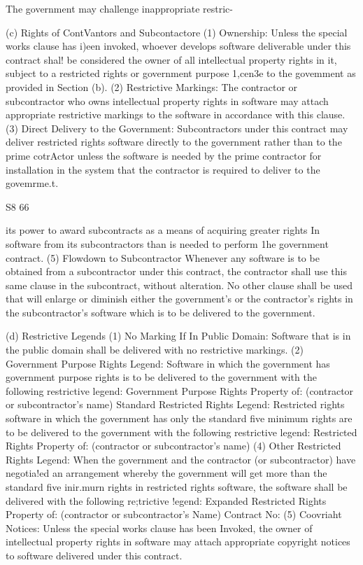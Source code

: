 \documentclass[12pt]{article}
\begin{document}
The government may challenge inappropriate restric-

(c) Rights of ContVantors and Subcontactore
(1) Ownership: Unless the special works clause has i)een invoked, whoever develops software deliverable under this contract shal! be considered the owner of all intellectual property rights in
it, subject to a restricted rights or government purpose 1,cen3e to the govemment as provided in
Section (b).
(2) Restrictive Markings: The contractor or subcontractor who owns intellectual property
rights in software may attach appropriate restrictive markings to the software in accordance with this
clause.
(3) Direct Delivery to the Government: Subcontractors under this contract may deliver
restricted rights software directly to the government rather than to the prime cotrActor unless the
software is needed by the prime contractor for installation in the system that the contractor is required
to deliver to the govemrme.t.

S8
66

its power to award subcontracts as a means of acquiring greater rights In software from its subcontractors than is needed to perform 1he government contract.
(5) Flowdown to Subcontractor Whenever any software is to be obtained from a subcontractor under this contract, the contractor shall use this same clause in the subcontract, without alteration.
No other clause shall be used that will enlarge or diminish either the government's or the contractor's
rights in the subcontractor's software which is to be delivered to the government.

(d) Restrictive Legends
(1) No Marking If In Public Domain: Software that is in the public domain shall be delivered
with no restrictive markings.
(2) Government Purpose Rights Legend: Software in which the government has government purpose rights is to be delivered to the government with the following restrictive legend:
Government Purpose Rights
Property of: (contractor or subcontractor's name)
Standard Restricted Rights Legend: Restricted rights software in which the government has only the
standard five minimum rights are to be delivered to the government with the following restrictive
legend:
Restricted Rights
Property of: (contractor or subcontractor's name)
(4) Other Restricted Rights Legend: When the government and the contractor (or
subcontractor) have negotia!ed an arrangement whereby the government will get more than the standard five inir.murn rights in restricted rights software, the software shall be delivered with the following re;trictive !egend:
Expanded Restricted Rights
Property of: (contractor or subcontractor's Name)
Contract No:
(5) Coovriaht Notices: Unless the special works clause has been Invoked, the owner of
intellectual property rights in software may attach appropriate copyright notices to software delivered
under this contract.
\end{document}
